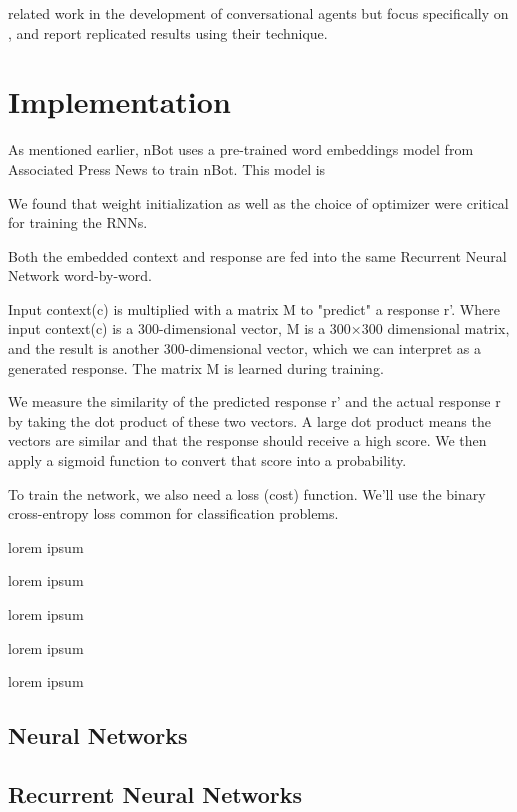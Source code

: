 \documentclass[letterpaper] {article} %
\begin{document}
related work in the development of conversational agents but focus specifically on \cite{lowe2015ubuntu}, and report replicated results using their technique.

\section{Implementation}
As mentioned earlier, nBot uses a pre-trained word embeddings model from Associated Press News to train nBot. This model is 

We found that weight initialization as well as the choice of optimizer were critical for training the RNNs.

Both the embedded context and response are fed into the same Recurrent Neural Network word-by-word.

Input context(c) is multiplied with a matrix M to "predict" a response r'. Where input context(c) is a 300-dimensional vector, M is a 300×300 dimensional matrix, and the result is another 300-dimensional vector, which we can interpret as a generated response. The matrix M is learned during training.

We measure the similarity of the predicted response r' and the actual response r by taking the dot product of these two vectors. A large dot product means the vectors are similar and that the response should receive a high score. We then apply a sigmoid function to convert that score into a probability.

To train the network, we also need a loss (cost) function. We’ll use the binary cross-entropy loss common for classification problems.

\begin{itemize}
\end{itemize}

\subsection{Neural Networks}

\subsection{Recurrent Neural Networks} 
\end{document}

